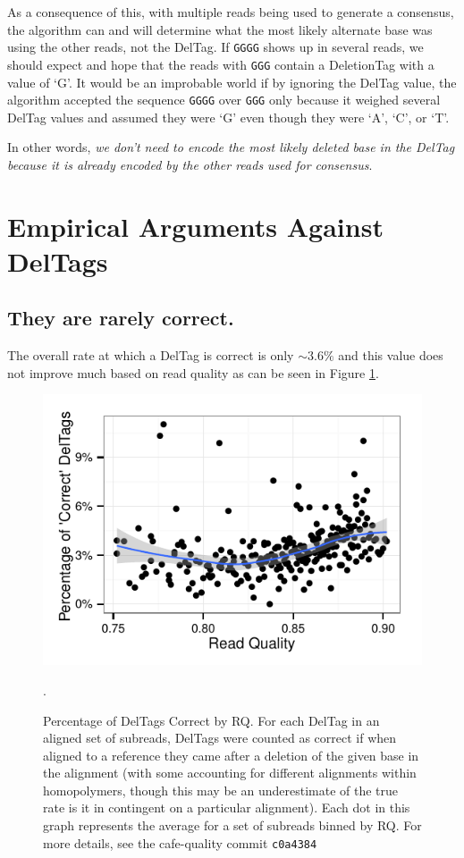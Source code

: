 \documentclass[fleqn,10pt]{SelfArx} %
\begin{document}
As a consequence of this, with multiple reads being used to generate a consensus, the algorithm can and will determine what the most likely alternate base was using the other reads, not the DelTag.  If \texttt{GGGG} shows up in several reads, we should expect and hope that the reads with \texttt{GGG} contain a DeletionTag with a value of `G'.  It would be an improbable world if by ignoring the DelTag value, the algorithm accepted the sequence \texttt{GGGG} over \texttt{GGG} only because it weighed several DelTag values and assumed they were `G' even though they were `A', `C', or `T'. 

In other words, \textit{we don't need to encode the most likely deleted base in the DelTag because it is already encoded by the other reads used for consensus}. 
 






\section{Empirical Arguments Against DelTags}

\subsection{They are rarely correct.}

The overall rate at which a DelTag is correct is only $\sim3.6\%$ and this value does not improve much based on read quality as can be seen in Figure \ref{fig:rateCorrect}.  


\begin{figure}[ht]\centering
\includegraphics[width=\linewidth]{TagCorrectRateByRQ.pdf}
\caption{Percentage of DelTags Correct by RQ.  For each DelTag in an aligned set of subreads, DelTags were counted as correct if when aligned to a reference they came after a deletion of the given base in the alignment (with some accounting for different alignments within homopolymers, though this may be an underestimate of the true rate is it in contingent on a particular alignment).  Each dot in this graph represents the average for a set of subreads binned by RQ. For more details, see the cafe-quality commit \texttt{c0a4384}}.
\label{fig:rateCorrect}
\end{figure}
\end{document}

